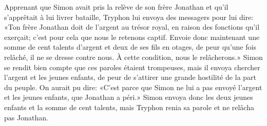 Apprenant que Simon avait pris la relève de son frère Jonathan
		et qu’il s’apprêtait à lui livrer bataille,
	Tryphon lui envoya des messagers pour lui dire:
«Ton frère Jonathan doit de l’argent au trésor royal,
	en raison des fonctions qu’il exerçait;
	c’est pour cela que nous le retenons captif.
Envoie donc maintenant une somme de cent talents d’argent et deux de ses fils en otages,
	de peur qu’une fois relâché, il ne se dresse contre nous.
	À cette condition, nous le relâcherons.»
Simon se rendit bien compte que ces paroles étaient trompeuses,
	mais il envoya chercher l’argent et les jeunes enfants,
	de peur de s’attirer une grande hostilité de la part du peuple.
On aurait pu dire:
	«C’est parce que Simon ne lui a pas envoyé l’argent et les jeunes enfants,
	que Jonathan a péri.»
Simon envoya donc les deux jeunes enfants et la somme de cent talents,
	mais Tryphon renia sa parole et ne relâcha pas Jonathan.
